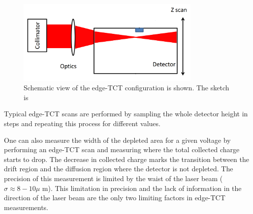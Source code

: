 \begin{figure}[H]
	\centering
	\includegraphics[width=0.8\textwidth]{chap4_eTCT.png}
	\caption{Schematic view of the edge-TCT configuration is shown. The sketch is}
	\label{fig:eTCT}
\end{figure}


Typical edge-TCT scans are performed by sampling the whole detector height in steps and repeating this process for different \vias values.

One can also measure the width of the depleted area for a given voltage by performing an edge-TCT scan and measuring where the total collected charge starts to drop. The decrease in collected charge marks the transition between the drift region and the diffusion region where the detector is not depleted. The precision of this measurement is limited by the waist of the laser beam ($ \sigma \approx 8-10 \mu $ m). This limitation in precision and the lack of information in the direction of the laser beam are the only two limiting factors in edge-TCT measurements.


